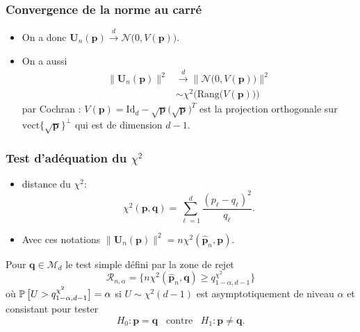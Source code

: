 \begin{frame}
\frametitle{Convergence de la norme au carré}
\begin{itemize}
\item On a donc ${\boldsymbol U}_n(\boldsymbol{p}) \stackrel{d}{\longrightarrow} {\mathcal N}\big(0,V(\boldsymbol{p})\big)$.
\item On a aussi
\begin{align*}
\|{\boldsymbol U}_n(\boldsymbol{p}) \|^2 & \stackrel{d}{\longrightarrow} \| {\mathcal N}\big(0,V(\boldsymbol{p})\big)\|^2 \\
& \sim \chi^2\big(\mathrm{Rang}\big(V(\boldsymbol{p})\big)\big)
\end{align*}
par \alert{Cochran} :  $V(\boldsymbol{p}) = \mathrm{Id}_d-\sqrt{\boldsymbol{p}}\big(\sqrt{\boldsymbol{p}}\big)^T$ est la projection orthogonale sur $\mathrm{vect}\{\sqrt{\boldsymbol{p}}\}^\perp$ qui est de dimension $d-1$.
\end{itemize}
\end{frame}

\begin{frame}
\frametitle{Test d'adéquation du $\chi^2$}
\begin{itemize}
\item  distance du $\chi^2$:
$$\chi^2(\boldsymbol{p},\boldsymbol{q})=\sum_{\ell=1}^d \frac{(p_\ell-q_\ell)^2}{q_\ell}.$$
\item Avec ces notations
$\|{\boldsymbol U}_n(\boldsymbol{p})\|^2=n\chi^2(\widehat {\boldsymbol p}_n,\boldsymbol{p}).$
\end{itemize}
\begin{prop}
Pour $\boldsymbol{q} \in {\mathcal M}_d$ le test simple défini par la zone de rejet
$${\mathcal R}_{n,\alpha} = \big\{n\chi^2(\widehat {\boldsymbol p}_n,\boldsymbol{q}) \geq q_{1-\alpha,d-1}^{\chi^2} \big\}$$
où
$\operatorname{{\mathbb P}}\big[U > q_{1-\alpha,d-1}^{\chi^2}\big]=\alpha$ si $U \sim \chi^2(d-1)$ est
\alert{asymptotiquement de niveau $\alpha$ et consistant} pour tester
$$H_0:\boldsymbol{p}=\boldsymbol{q}\;\;\;\text{contre}\;\;\;
H_1:\boldsymbol{p}\neq\boldsymbol{q}.$$
\end{prop}
\end{frame}

